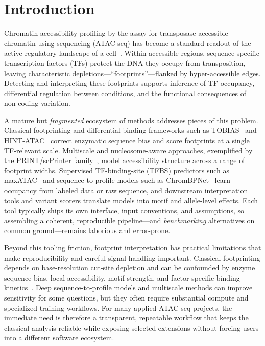 \documentclass[biomedinformatics,article,submit,pdftex,moreauthors]{Definitions/mdpi}
\begin{document}
\section{Introduction}

Chromatin accessibility profiling by the assay for transposase-accessible
chromatin using sequencing (ATAC-seq) has become a standard readout of the active
regulatory landscape of a cell~\cite{buenrostro2013}. Within accessible regions,
sequence-specific transcription factors (TFs) protect the DNA they occupy from
transposition, leaving characteristic depletions---``footprints''---flanked by
hyper-accessible edges. Detecting and interpreting these footprints supports
inference of TF occupancy, differential regulation between conditions, and the
functional consequences of non-coding variation.

A mature but \emph{fragmented} ecosystem of methods addresses pieces of this
problem. Classical footprinting and differential-binding frameworks such as
TOBIAS~\cite{bentsen2020} and HINT-ATAC~\cite{li2019hint} correct enzymatic
sequence bias and score footprints at a single TF-relevant scale. Multiscale and
nucleosome-aware approaches, exemplified by the PRINT/scPrinter
family~\cite{hu2024print}, model accessibility structure across a range of
footprint widths. Supervised TF-binding-site (TFBS) predictors such as
maxATAC~\cite{cazares2023maxatac} and sequence-to-profile models such as
ChromBPNet~\cite{chrombpnet2024} learn occupancy from labeled data or raw
sequence, and downstream interpretation tools and variant scorers translate models
into motif and allele-level effects. Each tool typically ships its own interface,
input conventions, and assumptions, so assembling a coherent, reproducible
pipeline---and \emph{benchmarking} alternatives on common ground---remains
laborious and error-prone.

Beyond this tooling friction, footprint interpretation has practical limitations
that make reproducibility and careful signal handling important. Classical
footprinting depends on base-resolution cut-site depletion and can be confounded
by enzyme sequence bias, local accessibility, motif strength, and factor-specific
binding kinetics~\cite{sung2014}. Deep sequence-to-profile models and multiscale
methods can improve sensitivity for some questions, but they often require
substantial compute and specialized training workflows. For many applied ATAC-seq
projects, the immediate need is therefore a transparent, repeatable workflow that
keeps the classical analysis reliable while exposing selected extensions without
forcing users into a different software ecosystem.
\end{document}
